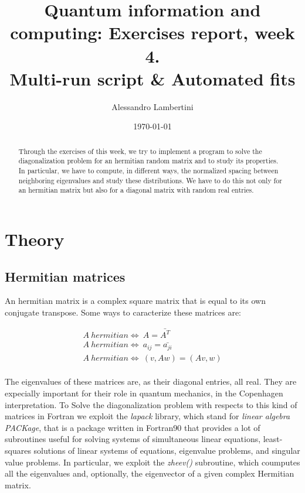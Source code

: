 \documentclass[prb,9pt,notitlepage]{revtex4-1}
\begin{document}
\title{Quantum information and computing: Exercises report, week 4. \\ Multi-run script \& Automated fits }

\author{Alessandro Lambertini}


\date{\today}

\begin{abstract}
Through the exercises of this week, we try to implement a program to solve the diagonalization problem for an hermitian random matrix and to study its properties. In particular, we have to compute, in different ways, the normalized spacing between neighboring eigenvalues and study these distributions. We have to do this not only for an hermitian matrix but also for a diagonal matrix with random real entries.
\end{abstract}

\maketitle

\section{Theory}
\subsection{Hermitian matrices}
An hermitian matrix is a complex square matrix that is equal to its own conjugate transpose. Some ways to caracterize these matrices are:

\begin{eqnarray}
  A \ hermitian \Longleftrightarrow \ A = \bar{A^T} \nonumber \\
  A \ hermitian \Longleftrightarrow \ a_{ij} = \bar{a_{ji}} \nonumber\\
  A \ hermitian \Longleftrightarrow \ (v,Aw) = (Av,w) \nonumber
\end{eqnarray}
\\
The eigenvalues of these matrices are, as their diagonal entries, all real. They are expecially important for their role in quantum mechanics, in the Copenhagen interpretation.
To Solve the diagonalization problem with respects to this kind of matrices in Fortran we exploit the \textit{lapack} library, which stand for \textit{linear algebra PACKage}, that is a package written in Fortran90 that provides a lot of subroutines useful for solving systems of simultaneous linear equations, least-squares solutions of linear systems of equations, eigenvalue problems, and singular value problems. In particular, we exploit the \textit{zheev()} subroutine, which coumputes all the eigenvalues and, optionally, the eigenvector of a given  complex Hermitian matrix.
\end{document}
